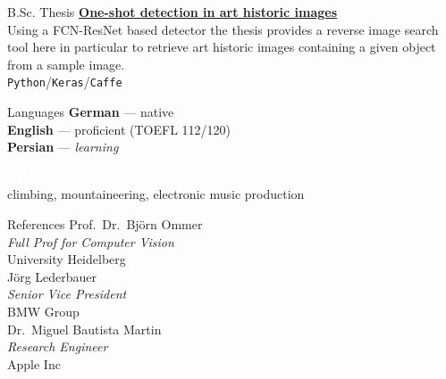 \documentclass{article}
\newcommand{\cvsect}[1]{
	\vspace{\baselineskip}
	\colorbox{primary}{\textcolor{white}{\MakeUppercase{\textbf{#1}}}}\\
}
\newcommand{\slashsep}{\hspace{2mm}/\hspace{2mm}}
\begin{document}
\begin{cvbox}{B.Sc. Thesis}
    \textbf{\href{https://github.com/morris-frank/ba_latex/blob/master/thesis.pdf}{One-shot detection in art historic images}}\\
    Using a FCN-ResNet based detector the thesis provides a reverse image search tool here in particular to retrieve art historic images containing a given object from a sample image.\\
    \texttt{Python}\slashsep\texttt{Keras}\slashsep\texttt{Caffe}\\

\end{cvbox}
\hfill
\begin{cvbox}{Languages}
	\textbf{German} --- native\\
	\textbf{English} --- proficient (TOEFL 112/120)\\
    \textbf{Persian} --- \textit{learning}

    \cvsect{Hobbies}

    climbing, mountaineering, electronic music production
\end{cvbox}
\hfill
\begin{cvbox}{References}
    Prof.\ Dr.\ Björn Ommer\\\emph{Full Prof for Computer Vision}\\University Heidelberg\\

    Jörg Lederbauer\\\emph{Senior Vice President}\\BMW Group\\

    Dr.\ Miguel Bautista Martin\\\emph{Research Engineer}\\Apple Inc
\end{cvbox}
\end{document}
